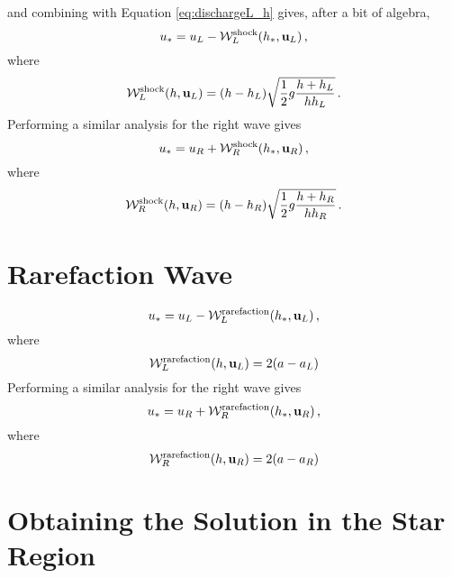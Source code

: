 and combining with Equation \eqref{eq:dischargeL_h} gives, after a bit of
algebra,
\begin{equation}\label{eq:ustarLshock}
  u_* = u_L
    - \mathcal{W}^{\text{shock}}_L(h_*,\mathbf{u}_L)
    \,,
\end{equation}
where
\begin{equation}
  \mathcal{W}^{\text{shock}}_L(h,\mathbf{u}_L)
    = (h - h_L)
    \sqrt{\frac{1}{2}g\frac{h + h_L}{hh_L}}
    \,.
\end{equation}
Performing a similar analysis for the right wave gives
\begin{equation}\label{eq:ustarRshock}
  u_* = u_R
    + \mathcal{W}^{\text{shock}}_R(h_*,\mathbf{u}_R)
    \,,
\end{equation}
where
\begin{equation}
  \mathcal{W}^{\text{shock}}_R(h,\mathbf{u}_R)
    = (h - h_R)
    \sqrt{\frac{1}{2}g\frac{h + h_R}{hh_R}}
    \,.
\end{equation}

\section{Rarefaction Wave}
\begin{equation}\label{eq:ustarLrarefaction}
  u_* = u_L
    - \mathcal{W}^{\text{rarefaction}}_L(h_*,\mathbf{u}_L)
    \,,
\end{equation}
where
\begin{equation}
  \mathcal{W}_L^{\text{rarefaction}}(h,\mathbf{u}_L)
    = 2(a - a_L)
\end{equation}
Performing a similar analysis for the right wave gives
\begin{equation}\label{eq:ustarRrarefaction}
  u_* = u_R
    + \mathcal{W}^{\text{rarefaction}}_R(h_*,\mathbf{u}_R)
    \,,
\end{equation}
where
\begin{equation}
  \mathcal{W}_R^{\text{rarefaction}}(h,\mathbf{u}_R)
    = 2(a - a_R)
\end{equation}

\section{Obtaining the Solution in the Star Region}\label{sec:solution_star}

